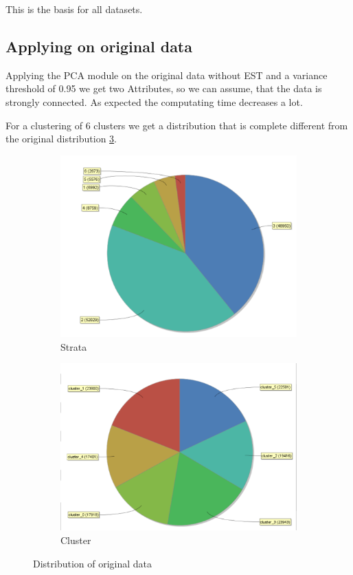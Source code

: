 This is the basis for all datasets.

\subsection{Applying on original data}
Applying the PCA module on the original data without EST and a variance
threshold of 0.95 we get two Attributes, so we can assume, that the data is strongly connected. As expected the computating time decreases a lot. 

For a clustering of 6 clusters we get a distribution that is complete different from the original distribution \ref{fig:OrgDist}. 
\begin{figure}
\centering
\begin{subfigure}{.5\textwidth}
  \centering
  \includegraphics[width=.4\linewidth]{ClusterOrigRapidStrata.PNG}
  \caption{Strata}
  \label{fig:OrgSt}
\end{subfigure}%
\begin{subfigure}{.5\textwidth}
  \centering
  \includegraphics[width=.4\linewidth]{ClusterOrigRapidCluster.PNG}
  \caption{Cluster}
  \label{fig:OrgCl}
\end{subfigure}
\caption{Distribution of original data}
\label{fig:OrgDist}
\end{figure}
